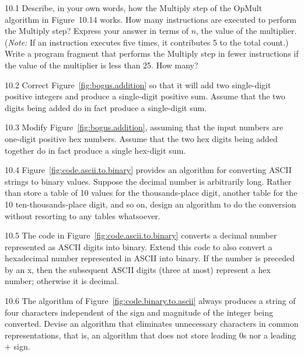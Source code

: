 \documentclass{patt}
\begin{document}
\begin{exercises}

\item [10.1]
  Describe, in your own words, how the Multiply step of the OpMult
  algorithm in Figure~10.14 works. How many instructions are executed
  to perform the Multiply step? Express your answer in terms of $n$,
  the value of the multiplier. ({\it Note:} If an instruction executes
  five times, it contributes 5 to the total count.) Write a program
  fragment that performs the Multiply step in fewer instructions if
  the value of the multiplier is less than 25. How many?

\item [10.2]
  Correct Figure~\ref{fig:bogus.addition} so that it will add two
  single-digit positive integers and produce a single-digit positive
  sum. Assume that the two digits being added do in fact produce a
  single-digit sum.

\item [10.3]
  Modify Figure~\ref{fig:bogus.addition}, assuming that the input
  numbers are one-digit positive hex numbers. Assume that the two hex
  digits being added together do in fact produce a single hex-digit
  sum.

\item [10.4]
  Figure~\ref{fig:code.ascii.to.binary} provides an algorithm for
  converting ASCII strings to binary values. Suppose the decimal
  number is arbitrarily long.  Rather than store a table of 10 values
  for the thousands-place digit, another table for the 10
  ten-thousands-place digit, and so on, design an algorithm to do the
  conversion without resorting to any tables whatsoever.

\item [10.5]
  The code in Figure~\ref{fig:code.ascii.to.binary} converts a decimal
  number represented as ASCII digits into binary. Extend this code to
  also convert a hexadecimal number represented in ASCII into
  binary. If the number is preceded by an x, then the subsequent ASCII
  digits (three at most) represent a hex number; otherwise it is
  decimal.

\item [10.6]
  The algorithm of Figure~\ref{fig:code.binary.to.ascii} always
  produces a string of four characters independent of the sign and
  magnitude of the integer being converted. Devise an algorithm that
  eliminates unnecessary characters in common representations, that
  is, an algorithm that does not store leading 0s nor a leading $+$
  sign.


\end{exercises}
\end{document}
